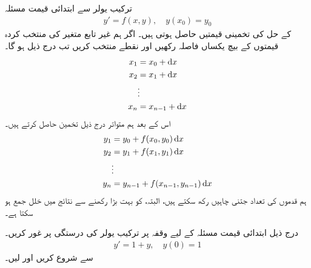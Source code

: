 ترکیب یولر سے ابتدائی قیمت مسئلہ
\begin{align*}
y'=f(x,y),\quad y(x_0)=y_0
\end{align*}
کے حل کی تخمینی قیمتیں حاصل ہوتی ہیں۔ اگر ہم غیر تابع متغیر کی منتخب کردہ قیمتوں کے بیچ یکساں فاصلہ رکھیں اور       نقطے منتخب کریں تب درج ذیل ہو گا۔
\begin{gather}
\begin{aligned}\label{مساوات_ماورائی_ترکیب_یولر_ایکس}
x_1&=x_0+\dif x\\
x_2&=x_1+\dif x\\
&\vdots\\
x_n&=x_{n-1}+\dif x
\end{aligned}
\end{gather}
اس کے بعد ہم متواتر درج ذیل  تخمین حاصل کرتے ہیں۔
\begin{gather}
\begin{aligned}\label{مساوات_ماورائی_ترکیب_یولر_وائے}
y_1&=y_0+f(x_0,y_0)\dif x\\
y_2&=y_1+f(x_1,y_1)\dif x\\
&\vdots\\
y_n&=y_{n-1}+f(x_{n-1},y_{n-1})\dif x
\end{aligned}
\end{gather}
ہم قدموں کی تعداد  جتنی چاہیں رکھ سکتے ہیں، البتہ،  کو بہت بڑا رکھنے سے نتائج میں خلل جمع ہو سکتا ہے۔

درج ذیل ابتدائی قیمت مسئلہ کے لیے وقفہ  پر  ترکیب یولر کی درستگی پر غور کریں۔
\begin{align*}
y'=1+y,\quad y(0)=1
\end{align*}
 سے شروع کریں اور  لیں۔

